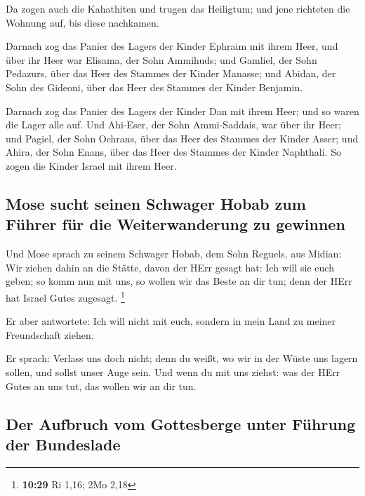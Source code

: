  Da zogen auch die Kahathiten und trugen das Heiligtum;
und jene richteten die Wohnung auf, bis diese nachkamen.

 Darnach zog das Panier des Lagers der Kinder Ephraim mit
ihrem Heer, und über ihr Heer war Elisama, der Sohn Ammihuds;
 und Gamliel, der Sohn Pedazurs, über das Heer des
Stammes der Kinder Manasse;  und Abidan, der Sohn des
Gideoni, über das Heer des Stammes der Kinder Benjamin.

 Darnach zog das Panier des Lagers der Kinder Dan mit
ihrem Heer; und so waren die Lager alle auf. Und Ahi-Eser, der Sohn
Ammi-Saddais, war über ihr Heer;  und Pagiel, der Sohn
Ochrans, über das Heer des Stammes der Kinder Asser;  und
Ahira, der Sohn Enans, über das Heer des Stammes der Kinder Naphthali.
 So zogen die Kinder Israel mit ihrem Heer.

\hypertarget{mose-sucht-seinen-schwager-hobab-zum-fuxfchrer-fuxfcr-die-weiterwanderung-zu-gewinnen}{%
\subsection{Mose sucht seinen Schwager Hobab zum Führer für die
Weiterwanderung zu
gewinnen}\label{mose-sucht-seinen-schwager-hobab-zum-fuxfchrer-fuxfcr-die-weiterwanderung-zu-gewinnen}}

 Und Mose sprach zu seinem Schwager Hobab, dem Sohn
Reguels, aus Midian: Wir ziehen dahin an die Stätte, davon der HErr
gesagt hat: Ich will sie euch geben; so komm nun mit uns, so wollen wir
das Beste an dir tun; denn der HErr hat Israel Gutes zugesagt.
\footnote{\textbf{10:29} Ri 1,16; 2Mo 2,18}

 Er aber antwortete: Ich will nicht mit euch, sondern in
mein Land zu meiner Freundschaft ziehen.

 Er sprach: Verlass uns doch nicht; denn du weißt, wo wir
in der Wüste uns lagern sollen, und sollst unser Auge sein.
 Und wenn du mit uns ziehst: was der HErr Gutes an uns
tut, das wollen wir an dir tun.

\hypertarget{der-aufbruch-vom-gottesberge-unter-fuxfchrung-der-bundeslade}{%
\subsection{Der Aufbruch vom Gottesberge unter Führung der
Bundeslade}\label{der-aufbruch-vom-gottesberge-unter-fuxfchrung-der-bundeslade}}

